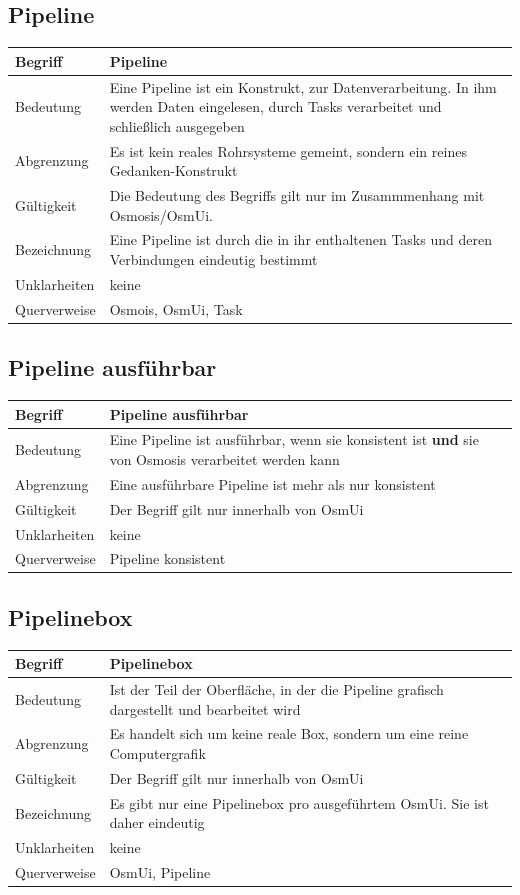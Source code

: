 \documentclass[a4paper,12pt]{scrartcl}
\begin{document}
\begin{center}
\subsection{Pipeline}
\begin{tabular}{|p{5cm}|p{10cm}|}
\hline Begriff & \textbf{Pipeline} \\ 
\hline Bedeutung & Eine Pipeline ist ein Konstrukt, zur Datenverarbeitung. In ihm werden Daten eingelesen, durch Tasks verarbeitet und schließlich ausgegeben\\ 
\hline Abgrenzung & Es ist kein reales Rohrsysteme gemeint, sondern ein reines Gedanken-Konstrukt \\ 
\hline Gültigkeit & Die Bedeutung des Begriffs gilt nur im Zusammmenhang mit Osmosis/OsmUi. \\ 
\hline Bezeichnung & Eine Pipeline ist durch die in ihr enthaltenen Tasks und deren Verbindungen eindeutig bestimmt \\ 
\hline Unklarheiten & keine \\ 
\hline Querverweise & Osmois, OsmUi, Task \\ 
\hline 
\end{tabular}
\subsection{Pipeline ausführbar}
\begin{tabular}{|p{5cm}|p{10cm}|}
\hline Begriff & \textbf{Pipeline ausführbar} \\ 
\hline Bedeutung & Eine Pipeline ist ausführbar, wenn sie konsistent ist \textbf{und} sie von Osmosis verarbeitet werden kann\\ 
\hline Abgrenzung & Eine ausführbare Pipeline ist mehr als nur konsistent \\ 
\hline Gültigkeit & Der Begriff gilt nur innerhalb von OsmUi \\  
\hline Unklarheiten & keine \\ 
\hline Querverweise & Pipeline konsistent \\ 
\hline 
\end{tabular}
\subsection{Pipelinebox}
\begin{tabular}{|p{5cm}|p{10cm}|}
\hline Begriff & \textbf{Pipelinebox} \\ 
\hline Bedeutung & Ist der Teil der Oberfläche, in der die Pipeline grafisch dargestellt und bearbeitet wird \\ 
\hline Abgrenzung & Es handelt sich um keine reale Box, sondern um eine reine Computergrafik \\ 
\hline Gültigkeit & Der Begriff gilt nur innerhalb von OsmUi \\ 
\hline Bezeichnung & Es gibt nur eine Pipelinebox pro ausgeführtem OsmUi. Sie ist daher eindeutig \\ 
\hline Unklarheiten & keine \\ 
\hline Querverweise & OsmUi, Pipeline \\ 
\hline 
\end{tabular}

\end{center}
\end{document}
